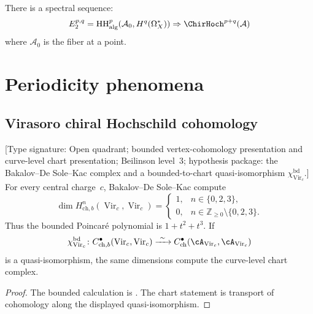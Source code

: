 \begin{theorem}\label{thm:hochschild-classical-comparison}
There is a spectral sequence:
\[
E_2^{p,q}
= \mathrm{HH}^p_{\mathrm{alg}}(\mathcal{A}_0, H^q(\Omega^*_X))
\Rightarrow \ChirHoch^{p+q}(\mathcal{A})
\]
where $\mathcal{A}_0$ is the fiber at a point.
\end{theorem}

\section{Periodicity phenomena}

\subsection{Virasoro chiral Hochschild cohomology}

\begin{theorem}\label{thm:virasoro-hochschild}
\textup{[Type signature: Open quadrant; bounded vertex-cohomology
presentation and curve-level chart presentation; Beilinson level~$3$;
hypothesis package: the Bakalov--De Sole--Kac complex and a
bounded-to-chart quasi-isomorphism $\chi_{\operatorname{Vir}_c}^{\mathrm{bd}}$.]}
For every central charge~$c$, Bakalov--De Sole--Kac compute
\[
 \dim H^n_{\mathrm{ch},b}(\operatorname{Vir}_c,
 \operatorname{Vir}_c)
 =\begin{cases}
 1,&n\in\{0,2,3\},\\
 0,&n\in\mathbb Z_{\geq0}\setminus\{0,2,3\}.
 \end{cases}
\]
Thus the bounded Poincar\'e polynomial is $1+t^2+t^3$.  If
\[
 \chi_{\operatorname{Vir}_c}^{\mathrm{bd}}\colon
 C^\bullet_{\mathrm{ch},b}(\operatorname{Vir}_c,
 \operatorname{Vir}_c)
 \xrightarrow{\ \sim\ }
 C^\bullet_{\mathrm{ch}}(\cA_{\operatorname{Vir}_c},
 \cA_{\operatorname{Vir}_c})
\]
is a quasi-isomorphism, the same dimensions compute the curve-level
chart complex.
\end{theorem}

\begin{proof}
The bounded calculation is \cite[Theorem~7.2]{BDSK21}.  The chart
statement is transport of cohomology along the displayed
quasi-isomorphism.
\end{proof}

